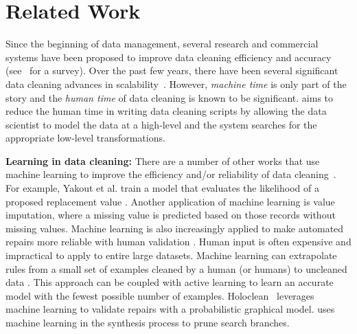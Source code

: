 \section{Related Work}
Since the beginning of data management, several research and commercial systems have been proposed to improve data cleaning efficiency and accuracy (see~\cite{rahm2000data} for a survey).
Over the past few years, there have been several significant data cleaning advances in scalability~\cite{wang1999sample, khayyat2015bigdansing, altowim2014progressive}.
However, \emph{machine time} is only part of the story and the \emph{human time} of data cleaning is known to be significant.
\sys aims to reduce the human time in writing data cleaning scripts by allowing the data scientist to model the data at a high-level and the system searches for the appropriate low-level transformations.

\vspace{0.25em} \noindent \textbf{Learning in data cleaning: } There are a number of other works that use machine learning to improve the efficiency and/or reliability of data cleaning~\cite{DBLP:journals/pvldb/YakoutENOI11,yakout2013don,gokhale2014corleone}.
For example, Yakout et al. train a model that evaluates the likelihood of a proposed replacement value \cite{yakout2013don}.
Another application of machine learning is value imputation, where a missing value is predicted based on those records without missing values.
Machine learning is also increasingly applied to make automated repairs more reliable with human validation \cite{DBLP:journals/pvldb/YakoutENOI11}.
Human input is often expensive and impractical to apply to entire large datasets.
Machine learning can extrapolate rules from a small set of examples cleaned by a human (or humans) to uncleaned data \cite{gokhale2014corleone, DBLP:journals/pvldb/YakoutENOI11}.
This approach can be coupled with active learning \cite{DBLP:journals/pvldb/MozafariSFJM14} to learn an accurate model with the fewest possible number of examples.
Holoclean~\cite{rekatsinas2017holoclean} leverages machine learning to validate repairs with a probabilistic graphical model.
\sys uses machine learning in the synthesis process to prune search branches.


